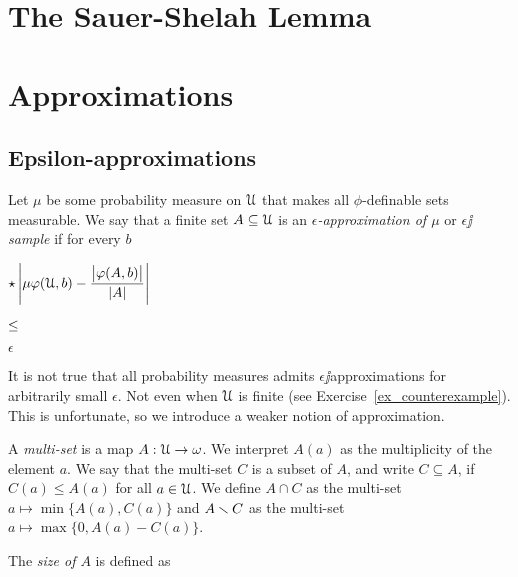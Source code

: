 \documentclass[combinatorics.tex]{subfiles}
\begin{document}
\chapter{The Sauer-Shelah Lemma}
\label{combinatorics}

\def\vc{{\footnotesize VC}}
\def\nip{{\footnotesize NIP}}


\def\medrel#1{\parbox[t]{6ex}{$\displaystyle\hfil #1$}}
\def\ceq#1#2#3{\parbox[t]{25ex}{$\displaystyle #1$}\medrel{#2}{$\displaystyle #3$}}

\def\mr{\color{brown}}
\def\gr{\color{green}}


\chapter{Approximations}
\section{Epsilon-approximations}\label{epsilon_approximations}

\def\Av{\mathbin{\textrm{Av}}}
\def\disc{\mathbin{\textrm{disc}}}
\def\ceq#1#2#3{\parbox[t]{30ex}{$\displaystyle #1$}\parbox{5ex}{$\displaystyle\hfil #2$}{$\displaystyle #3$}}

Let $\mu$ be some probability measure on $\EuScript U$ that makes all $\phi$-definable sets measurable.
We say that a finite set $A\subseteq\EuScript U$ is an \emph{$\epsilon$-approximation of $\mu$\/} or \emph{$\epsilon\jj$sample\/} if for every $b$

\ceq{\star\hfill\left|\mu\phi(\U,b) - \frac{\big|\phi(A,b)\big|}{|A|}\right|}{\le}{\epsilon}

It is not true that all probability measures admits $\epsilon\jj$approximations for arbitrarily small $\epsilon$. Not even when $\EuScript U$ is finite (see Exercise~\ref{ex_counterexample}).
This is unfortunate, so we introduce a weaker notion of approximation.

A \emph{multi-set\/} is a map $A:\EuScript U\to\omega$.
We interpret $A(a)$ as the multiplicity of the element $a$.
We say that the multi-set $C$ is a subset of $A$, and write $C\subseteq A$, if $C(a)\le A(a)$ for all $a\in\EuScript U$. 
We define $A\cap C$ as the multi-set $a\mapsto\min\{A(a),C(a)\}$ and  $A\smallsetminus C$ as the multi-set $a\mapsto\max\{0,A(a)-C(a)\}$.

The \emph{size of $A$\/} is defined as
\end{document}
